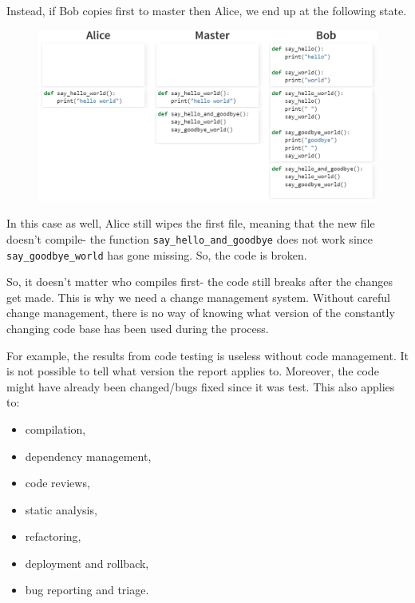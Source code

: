 \documentclass[a4paper, openany]{memoir}
\begin{document}
Instead, if Bob copies first to master then Alice, we end up at the following state.
\begin{figure}[H]
    \centering
    \includegraphics[scale=0.5]{src/3.4 Example4.PNG}
\end{figure}
\noindent In this case as well, Alice still wipes the first file, meaning that the new file doesn't compile- the function \texttt{say\_hello\_and\_goodbye} does not work since \texttt{say\_goodbye\_world} has gone missing. So, the code is broken.

So, it doesn't matter who compiles first- the code still breaks after the changes get made. This is why we need a change management system. Without careful change management, there is no way of knowing what version of the constantly changing code base has been used during the process.

For example, the results from code testing is useless without code management. It is not possible to tell what version the report applies to. Moreover, the code might have already been changed/bugs fixed since it was test. This also applies to:
\begin{itemize}
    \item compilation,
    \item dependency management,
    \item code reviews,
    \item static analysis,
    \item refactoring,
    \item deployment and rollback,
    \item bug reporting and triage.
\end{itemize}
\end{document}
